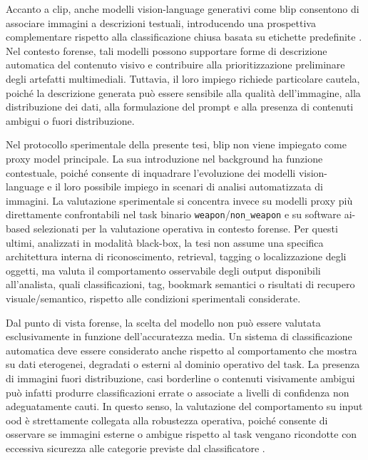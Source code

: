 Accanto a \gls{clip}, anche modelli vision-language generativi come \gls{blip} consentono di associare immagini a descrizioni testuali, introducendo una prospettiva complementare rispetto alla classificazione chiusa basata su etichette predefinite \cite{li2022blip}. Nel contesto forense, tali modelli possono supportare forme di descrizione automatica del contenuto visivo e contribuire alla prioritizzazione preliminare degli artefatti multimediali. Tuttavia, il loro impiego richiede particolare cautela, poiché la descrizione generata può essere sensibile alla qualità dell'immagine, alla distribuzione dei dati, alla formulazione del prompt e alla presenza di contenuti ambigui o fuori distribuzione.

Nel protocollo sperimentale della presente tesi, \gls{blip} non viene impiegato
come proxy model principale. La sua introduzione nel background ha funzione
contestuale, poiché consente di inquadrare l'evoluzione dei modelli
vision-language e il loro possibile impiego in scenari di analisi automatizzata
di immagini. La valutazione sperimentale si concentra invece su modelli proxy
più direttamente confrontabili nel task binario
\texttt{weapon}/\texttt{non\_weapon} e su software \gls{ai}-based selezionati per la
valutazione operativa in contesto forense. Per questi ultimi, analizzati in
modalità black-box, la tesi non assume una specifica architettura interna di
riconoscimento, retrieval, tagging o localizzazione degli oggetti, ma valuta il
comportamento osservabile degli output disponibili all'analista, quali
classificazioni, tag, bookmark semantici o risultati di recupero
visuale/semantico, rispetto alle condizioni sperimentali considerate.

Dal punto di vista forense, la scelta del modello non può essere valutata esclusivamente in funzione dell'accuratezza media. Un sistema di classificazione automatica deve essere considerato anche rispetto al comportamento che mostra su dati eterogenei, degradati o esterni al dominio operativo del task. La presenza di immagini fuori distribuzione, casi borderline o contenuti visivamente ambigui può infatti produrre classificazioni errate o associate a livelli di confidenza non adeguatamente cauti. In questo senso, la valutazione del comportamento su input \gls{ood} è strettamente collegata alla robustezza operativa, poiché consente di osservare se immagini esterne o ambigue rispetto al task vengano ricondotte con eccessiva sicurezza alle categorie previste dal classificatore \cite{hendrycks2017baseline,fort2021exploring}.

